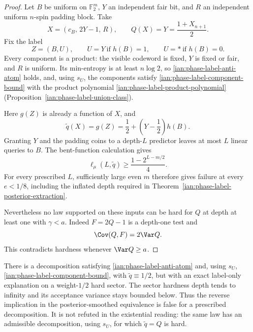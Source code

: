 \begin{proof}
Let \(B\) be uniform on \(\mathbb F_2^m\), \(Y\) an independent fair bit, and \(R\) an independent uniform \(n\)-spin padding block. Take
\[
 X=(c_B,\,2Y-1,\,R),\qquad Q(X)=Y=\frac{1+X_{n+1}}2.
\]
Fix the label
\[
 Z=(B,U),\qquad
 U=Y\ \text{if }h(B)=1,\qquad U=*\ \text{if }h(B)=0.
\]
Every component is a product: the visible codeword is fixed, \(Y\) is fixed or fair, and \(R\) is uniform. Its min-entropy is at least \(n\log2\), so \eqref{ian:phase-label-anti-atom} holds, and, using \(s_U\), the components satisfy \eqref{ian:phase-label-component-bound} with the product polynomial
\eqref{ian:phase-label-product-polynomial} (Proposition~\ref{ian:phase-label-union-class}).

Here \(g(Z)\) is already a function of \(X\), and
\[
 \widetilde q(X)=g(Z)
 =\frac12+\left(Y-\frac12\right)h(B).
\]
Granting \(Y\) and the padding coins to a depth-\(L\) predictor leaves at most \(L\) linear queries to \(B\). The bent-function calculation gives
\[
 \ell_\mu(L,\widetilde q)
 \ge\frac{1-2^{L-m/2}}4.
\]
For every prescribed \(L\), sufficiently large even \(m\) therefore gives failure at every \(e<1/8\), including the inflated depth required in
Theorem~\ref{ian:phase-label-posterior-extraction}.

Nevertheless no law supported on these inputs can be hard for \(Q\) at depth at least one with \(\gamma<a\). Indeed \(F=2Q-1\) is a depth-one test and
\[
 \Cov(Q,F)=2\Var Q.
\]
This contradicts hardness whenever \(\Var Q\ge a\).
\end{proof}

\begin{proposition}
\label{ian:phase-label-constant-posterior-counterexample}
There is a decomposition satisfying \eqref{ian:phase-label-anti-atom} and, using \(s_U\), \eqref{ian:phase-label-component-bound}, with
\(\widetilde q\equiv1/2\), but with an exact label-only explanation on a weight-\(1/2\) hard sector. The sector hardness depth tends to infinity and its acceptance variance stays bounded below. Thus the reverse implication in the posterior-smoothed equivalence is false for a prescribed decomposition. It is not refuted in the existential reading: the same law has an admissible decomposition, using \(s_U\), for which \(\widetilde q=Q\) is hard.
\end{proposition}

